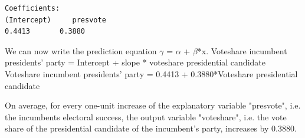 \documentclass[12pt,letterpaper]{article}
\begin{document}
\begin{enumerate}
\begin{BVerbatim}
Coefficients:
(Intercept)     presvote  
0.4413       0.3880 
\end{BVerbatim}

We can now write the prediction equation $\gamma$ = $\alpha$ + $\beta$*x.
\newline Voteshare incumbent presidents' party = Intercept + slope * voteshare presidential candidate
\newline Voteshare incumbent presidents' party = 0.4413 + 0.3880*Voteshare presidential candidate
		
On average, for every one-unit increase of the explanatory variable "presvote", i.e.  the incumbents electoral success, the output variable "voteshare", i.e. the vote share of the presidential candidate of the incumbent's party, increases by 0.3880. 

	\end{enumerate}
	

\newpage	
\end{document}
